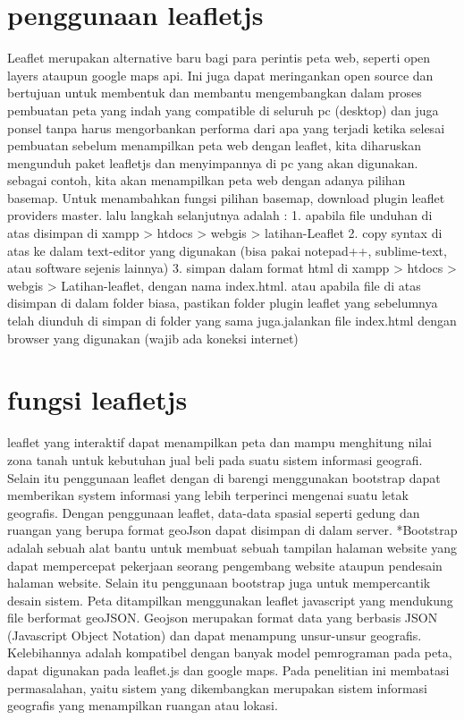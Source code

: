 \section{penggunaan leafletjs}
Leaflet merupakan alternative baru bagi para perintis peta web, seperti open layers ataupun google maps api. Ini juga dapat meringankan open source dan bertujuan untuk membentuk dan membantu mengembangkan dalam proses pembuatan peta yang indah yang compatible di seluruh pc (desktop) dan juga ponsel tanpa harus mengorbankan performa dari apa yang terjadi ketika selesai pembuatan
sebelum menampilkan peta web dengan leaflet, kita diharuskan mengunduh paket leafletjs dan menyimpannya di pc yang akan digunakan. 
sebagai contoh, kita akan menampilkan peta web dengan adanya pilihan basemap. Untuk menambahkan fungsi pilihan basemap, download plugin leaflet providers master. lalu langkah selanjutnya adalah :
1. apabila file unduhan di atas disimpan di xampp > htdocs > webgis > latihan-Leaflet
2. copy syntax di atas ke dalam text-editor yang digunakan (bisa pakai notepad++, sublime-text, atau software sejenis lainnya)
3. simpan dalam format html di xampp > htdocs > webgis > Latihan-leaflet, dengan nama index.html. atau apabila file di atas disimpan di      dalam folder biasa, pastikan folder plugin leaflet yang sebelumnya telah diunduh di simpan di folder yang sama juga.jalankan file          index.html dengan browser yang digunakan (wajib ada koneksi internet)

\section{fungsi leafletjs}
leaflet yang interaktif dapat menampilkan peta dan mampu menghitung nilai zona tanah untuk kebutuhan jual beli pada suatu sistem informasi geografi. Selain itu penggunaan leaflet dengan di barengi menggunakan bootstrap dapat memberikan system informasi yang lebih terperinci mengenai suatu letak geografis. Dengan penggunaan leaflet, data-data spasial seperti gedung dan ruangan yang berupa format geoJson dapat disimpan di dalam server. 
*Bootstrap adalah sebuah alat bantu untuk membuat sebuah tampilan halaman  website yang dapat mempercepat pekerjaan seorang pengembang website ataupun pendesain halaman website. Selain itu penggunaan bootstrap juga untuk mempercantik desain sistem. Peta ditampilkan menggunakan leaflet javascript yang mendukung file berformat geoJSON. Geojson merupakan format data yang berbasis JSON (Javascript Object Notation) dan dapat menampung unsur-unsur geografis. Kelebihannya adalah kompatibel dengan banyak model pemrograman pada peta, dapat digunakan pada leaflet.js dan google maps. Pada penelitian ini membatasi permasalahan, yaitu sistem yang dikembangkan merupakan sistem informasi geografis yang menampilkan ruangan atau lokasi.

